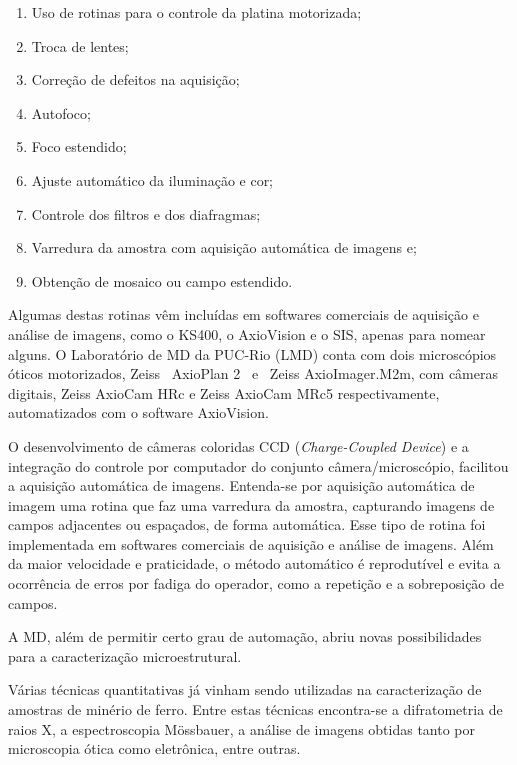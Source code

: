 \begin{enumerate}[label=$\triangleright$]
  \item Uso de rotinas para o controle da platina motorizada;\cite{37}
  \item Troca de lentes;
  \item Correção de defeitos na aquisição;\cite{38,39}
  \item Autofoco;\cite{40,41}
  \item Foco estendido;\cite{42,43}
  \item Ajuste automático da iluminação e cor;\cite{44,45}
  \item Controle dos filtros e dos diafragmas;
  \item Varredura da amostra com aquisição automática de imagens e;
  \item Obtenção de mosaico ou campo estendido.\cite{46}
\end{enumerate}

Algumas destas rotinas vêm incluídas em softwares comerciais de
aquisição e análise de imagens, como o KS400, o AxioVision e o SIS,
apenas para nomear alguns.\cite{47,48,49} O Laboratório de MD da
PUC-Rio (LMD) conta com dois microscópios óticos motorizados, Zeiss
~AxioPlan 2 ~e ~Zeiss AxioImager.M2m, com câmeras digitais, Zeiss
AxioCam HRc e Zeiss AxioCam MRc5 respectivamente, automatizados com o
software AxioVision.\cite{50}

O desenvolvimento de câmeras coloridas CCD (\textit{Charge-Coupled
  Device}) e a integração do controle por computador do conjunto
câmera/microscópio, facilitou a aquisição automática de
imagens.\cite{35,51} Entenda-se por aquisição automática de imagem uma
rotina que faz uma varredura da amostra, capturando imagens de campos
adjacentes ou espaçados, de forma automática. Esse tipo de rotina foi
implementada em softwares comerciais de aquisição e análise de
imagens. Além da maior velocidade e praticidade, o método automático é
reprodutível e evita a ocorrência de erros por fadiga do operador,
como a repetição e a sobreposição de campos.\cite{52}

A MD, além de permitir certo grau de automação, abriu novas
possibilidades para a caracterização microestrutural.\cite{35}

Várias técnicas quantitativas já vinham sendo utilizadas na
caracterização de amostras de minério de ferro.\cite{11} Entre estas
técnicas encontra-se a difratometria de raios X, a espectroscopia
Mössbauer, a análise de imagens obtidas tanto por microscopia ótica
como eletrônica, entre
outras.\cite{6,7,8,32,53,54,55,56,57,58,59,500,501}

